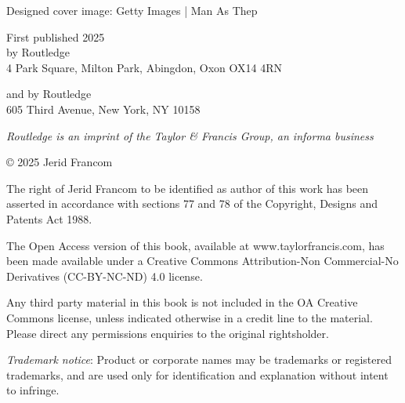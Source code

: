\documentclass[
  letterpaper,
  krantz1]{latex/krantz-mod}
\theoremstyle{definition}
\theoremstyle{definition}
\theoremstyle{remark}
\begin{document}
\maketitle
\setcounter{page}{4} %




\thispagestyle{empty}



Designed cover image: Getty Images | Man As Thep

First published 2025\\
by Routledge\\
4 Park Square, Milton Park, Abingdon, Oxon OX14 4RN

and by Routledge\\
605 Third Avenue, New York, NY 10158

\textit{Routledge is an imprint of the Taylor \& Francis Group, an informa business}

© 2025 Jerid Francom

The right of Jerid Francom to be identified as author of this work has been asserted in accordance with sections 77 and 78 of the Copyright, Designs and Patents Act 1988.

The Open Access version of this book, available at www.taylorfrancis.com, has been made available under a Creative Commons Attribution-Non Commercial-No Derivatives (CC-BY-NC-ND) 4.0 license.

Any third party material in this book is not included in the OA Creative Commons license, unless indicated otherwise in a credit line to the material. Please direct any permissions enquiries to the original rightsholder.

\textit{Trademark notice}: Product or corporate names may be trademarks or registered trademarks, and are used only for identification and explanation without intent to infringe.
\end{document}
